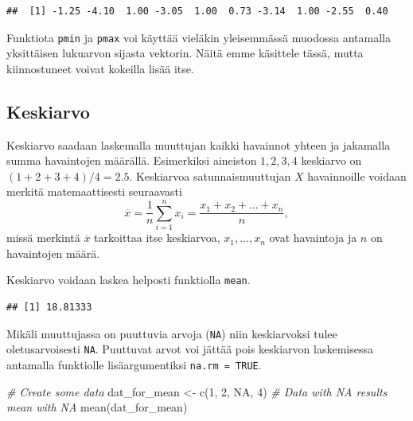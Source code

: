 \documentclass[
]{book}
\newenvironment{Shaded}{\begin{snugshade}}{\end{snugshade}}
\newcommand{\CommentTok}[1]{\textcolor[rgb]{0.56,0.35,0.01}{\textit{#1}}}
\newcommand{\ConstantTok}[1]{\textcolor[rgb]{0.00,0.00,0.00}{#1}}
\newcommand{\DecValTok}[1]{\textcolor[rgb]{0.00,0.00,0.81}{#1}}
\newcommand{\FunctionTok}[1]{\textcolor[rgb]{0.00,0.00,0.00}{#1}}
\newcommand{\NormalTok}[1]{#1}
\newcommand{\OtherTok}[1]{\textcolor[rgb]{0.56,0.35,0.01}{#1}}
\newcommand{\SpecialCharTok}[1]{\textcolor[rgb]{0.00,0.00,0.00}{#1}}
\begin{document}
\begin{verbatim}
##  [1] -1.25 -4.10  1.00 -3.05  1.00  0.73 -3.14  1.00 -2.55  0.40
\end{verbatim}

Funktiota \texttt{pmin} ja \texttt{pmax} voi käyttää vieläkin yleisemmässä muodossa antamalla yksittäisen lukuarvon sijasta vektorin. Näitä emme käsittele tässä, mutta kiinnostuneet voivat kokeilla lisää itse.

\hypertarget{keskiarvo}{%
\subsection{Keskiarvo}\label{keskiarvo}}

Keskiarvo saadaan laskemalla muuttujan kaikki havainnot yhteen ja jakamalla summa havaintojen määrällä. Esimerkiksi aineiston \(1,2,3,4\) keskiarvo on \((1+2+3+4)/4 = 2.5\). Keskiarvoa satunnaismuuttujan \(X\) havainnoille voidaan merkitä matemaattisesti seuraavasti
\[\overline{x} = \frac1n \sum_{i=1}^n x_i = \frac{x_1+x_2+\dots+x_n}{n},\]
missä merkintä \(\overline{x}\) tarkoittaa itse keskiarvoa, \(x_1,...,x_n\) ovat havaintoja ja \(n\) on havaintojen määrä.

Keskiarvo voidaan laskea helposti funktiolla \texttt{mean}.

\begin{Shaded}
\end{Shaded}

\begin{verbatim}
## [1] 18.81333
\end{verbatim}

Mikäli muuttujassa on puuttuvia arvoja (\texttt{NA}) niin keskiarvoksi tulee oletusarvoisesti \texttt{NA}. Puuttuvat arvot voi jättää pois keskiarvon laskemisessa antamalla funktiolle lisäargumentiksi \texttt{na.rm\ =\ TRUE}.

\begin{Shaded}
\begin{Highlighting}[]
\CommentTok{\# Create some data}
\NormalTok{dat\_for\_mean }\OtherTok{\textless{}{-}} \FunctionTok{c}\NormalTok{(}\DecValTok{1}\NormalTok{, }\DecValTok{2}\NormalTok{, }\ConstantTok{NA}\NormalTok{, }\DecValTok{4}\NormalTok{)}
\CommentTok{\# Data with NA results mean with NA}
\FunctionTok{mean}\NormalTok{(dat\_for\_mean)}
\end{Highlighting}
\end{Shaded}
\end{document}
